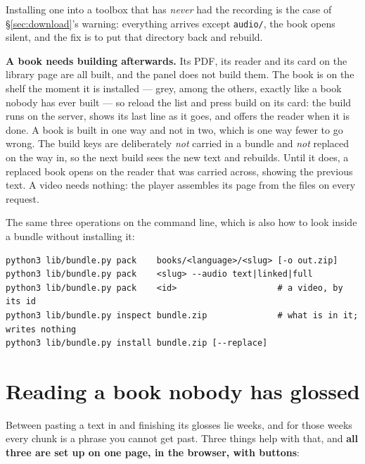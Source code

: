 \documentclass[11pt,oneside]{report}
\newcommand{\file}[1]{\texttt{#1}}
\newcommand{\menu}[1]{\textsf{#1}}
\begin{document}
Installing one into a toolbox that has \emph{never} had the recording is the
case of \S\ref{sec:download}'s warning: everything arrives except
\file{audio/}, the book opens silent, and the fix is to put that directory
back and rebuild.


\begin{warnbox}
\textbf{A book needs building afterwards.} Its PDF, its reader and its card
on the library page are all built, and the panel does not build them. The
book is on the shelf the moment it is installed --- grey, among the others,
exactly like a book nobody has ever built --- so reload the list and press
\menu{build} on its card: the build runs on the server, shows its last line
as it goes, and offers the reader when it is done. A book is built in one
way and not in two, which is one way fewer to go wrong. The build keys
are deliberately \emph{not} carried in a bundle and \emph{not} replaced on the
way in, so the next build sees the new text and rebuilds. Until it does, a
replaced book opens on the reader that was carried across, showing the
previous text. A video needs nothing: the player assembles its page from the
files on every request.
\end{warnbox}

\noindent The same three operations on the command line, which is also how to
look inside a bundle without installing it:

\begin{lstlisting}
python3 lib/bundle.py pack    books/<language>/<slug> [-o out.zip]
python3 lib/bundle.py pack    <slug> --audio text|linked|full
python3 lib/bundle.py pack    <id>                    # a video, by its id
python3 lib/bundle.py inspect bundle.zip              # what is in it; writes nothing
python3 lib/bundle.py install bundle.zip [--replace]
\end{lstlisting}

\section{Reading a book nobody has glossed}
\label{sec:lookup}

Between pasting a text in and finishing its glosses lie weeks, and for those
weeks every chunk is a phrase you cannot get past. Three things help with
that, and \textbf{all three are set up on one page, in the browser, with
buttons}:
\end{document}

